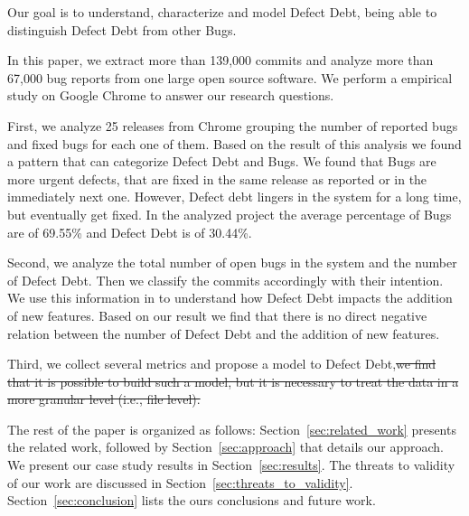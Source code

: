 Our goal is to understand, characterize and model Defect Debt, being able to distinguish Defect Debt from other Bugs.

In this paper, we extract more than 139,000 commits and analyze more than 67,000 bug reports from one large open source software. We perform a empirical study on Google Chrome to answer our research questions. 

First, we analyze 25 releases from Chrome grouping the number of reported bugs and fixed bugs for each one of them.  Based on the result of this analysis we found a pattern that can categorize Defect Debt and Bugs. We found that Bugs are more urgent defects,  that are fixed in the same release as reported or in the immediately next one. However, Defect debt lingers in the system for a long time, but eventually get fixed. In the analyzed project the average percentage of Bugs are of 69.55\% and Defect Debt is of 30.44\%.

Second, we analyze the total number of open bugs in the system and the number of Defect Debt. Then we classify the commits accordingly with their intention. We use this information in to understand how Defect Debt impacts the addition of new features. Based on our result we find that there is no direct negative relation between the number of Defect Debt and the addition of new features. 

Third, we collect several metrics and propose a model to Defect Debt,\sout{we find that it is possible to build such a model, but it is necessary to treat the data in a more granular level (i.e., file level).} 

The rest of the paper is organized as follows: Section~\ref{sec:related_work} presents the related work, followed by Section~\ref{sec:approach} that details our approach. We present our case study results in Section~\ref{sec:results}. The threats to validity of our work are discussed in Section~\ref{sec:threats_to_validity}. Section~\ref{sec:conclusion} lists the ours conclusions and future work. 